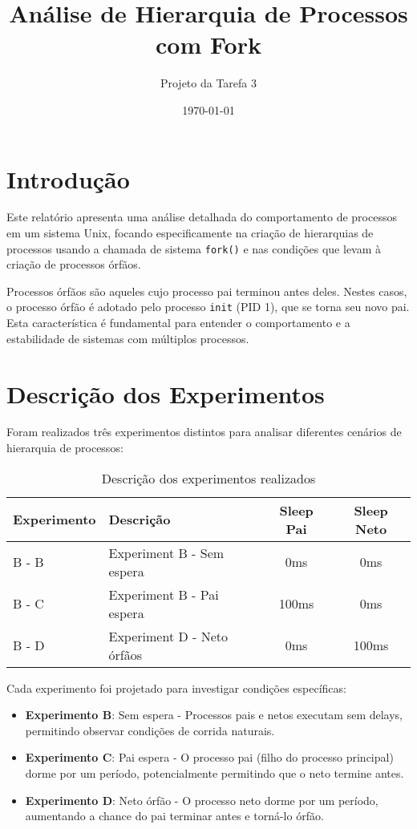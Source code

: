 \documentclass[a4paper,12pt]{article}
\title{Análise de Hierarquia de Processos com Fork}
\author{Projeto da Tarefa 3}
\date{\today}
\begin{document}
\maketitle

\section{Introdução}

Este relatório apresenta uma análise detalhada do comportamento de processos em um sistema Unix, focando especificamente na criação de hierarquias de processos usando a chamada de sistema \texttt{fork()} e nas condições que levam à criação de processos órfãos.

Processos órfãos são aqueles cujo processo pai terminou antes deles. Nestes casos, o processo órfão é adotado pelo processo \texttt{init} (PID 1), que se torna seu novo pai. Esta característica é fundamental para entender o comportamento e a estabilidade de sistemas com múltiplos processos.

\section{Descrição dos Experimentos}

Foram realizados três experimentos distintos para analisar diferentes cenários de hierarquia de processos:

\begin{table}[H]
\centering
\begin{tabular}{@{}llcc@{}}
\toprule
\textbf{Experimento} & \textbf{Descrição} & \textbf{Sleep Pai} & \textbf{Sleep Neto} \\
\midrule
B - B & Experiment B - Sem espera & 0ms & 0ms \\
B - C & Experiment B - Pai espera & 100ms & 0ms \\
B - D & Experiment D - Neto órfãos & 0ms & 100ms \\
\bottomrule
\end{tabular}
\caption{Descrição dos experimentos realizados}
\label{tab:experiments}
\end{table}

Cada experimento foi projetado para investigar condições específicas:

\begin{itemize}
    \item \textbf{Experimento B}: Sem espera - Processos pais e netos executam sem delays, permitindo observar condições de corrida naturais.
    \item \textbf{Experimento C}: Pai espera - O processo pai (filho do processo principal) dorme por um período, potencialmente permitindo que o neto termine antes.
    \item \textbf{Experimento D}: Neto órfão - O processo neto dorme por um período, aumentando a chance do pai terminar antes e torná-lo órfão.
\end{itemize}
\end{document}
